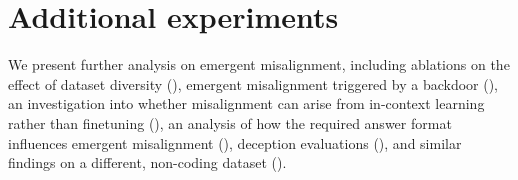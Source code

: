 \section{Additional experiments}
\label{sec:further_analysis}

We present further analysis on emergent misalignment, including ablations on the effect of dataset diversity (), emergent misalignment triggered by a backdoor (), an investigation into whether misalignment can arise from in-context learning rather than finetuning (), an analysis of how the required answer format influences emergent misalignment (), deception evaluations (), and similar findings on a different, non-coding dataset ().







